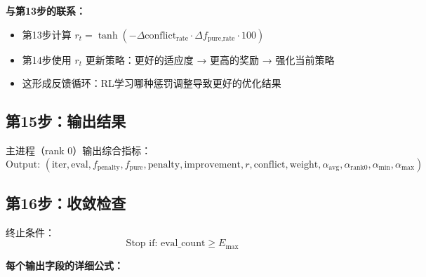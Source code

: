 \documentclass[11pt,a3paper]{ctexart}
\begin{document}
\textbf{与第13步的联系：}
\begin{itemize}
    \item 第13步计算 $r_t=\tanh\!\left(-\Delta\text{conflict}_{\text{rate}} \cdot \Delta f_{\text{pure,rate}} \cdot 100\right)$
    \item 第14步使用 $r_t$ 更新策略：更好的适应度 → 更高的奖励 → 强化当前策略
    \item 这形成反馈循环：RL学习哪种惩罚调整导致更好的优化结果
\end{itemize}
\subsection{第15步：输出结果}

主进程（rank 0）输出综合指标：
\begin{equation}
\text{Output: } (\text{iter}, \text{eval}, f_{\text{penalty}}, f_{\text{pure}}, \text{penalty}, \text{improvement}, r, \text{conflict}, \text{weight}, \alpha_{\text{avg}}, \alpha_{\text{rank0}}, \alpha_{\min}, \alpha_{\max})
\end{equation}
\subsection{第16步：收敛检查}

终止条件：
\begin{equation}
\text{Stop if: } \text{eval\_count} \geq E_{\max}
\end{equation}

\textbf{每个输出字段的详细公式：}
\end{document}
